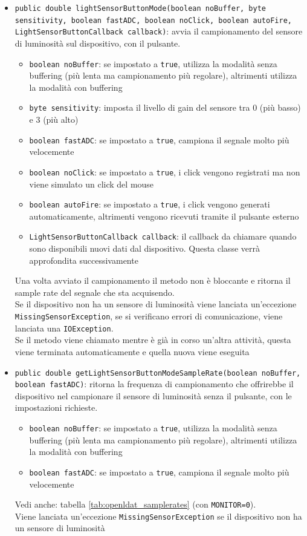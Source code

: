 \begin{itemize}
	\item \texttt{public double lightSensorButtonMode(boolean noBuffer, byte sensitivity, boolean fastADC, boolean noClick, boolean autoFire, LightSensorButtonCallback callback)}: avvia il campionamento del sensore di luminosità sul dispositivo, con il pulsante.\begin{itemize}
		\item \texttt{boolean noBuffer}: se impostato a \texttt{true}, utilizza la modalità senza buffering (più lenta ma campionamento più regolare), altrimenti utilizza la modalità con buffering
		\item \texttt{byte sensitivity}: imposta il livello di gain del sensore tra 0 (più basso) e 3 (più alto)
		\item \texttt{boolean fastADC}: se impostato a \texttt{true}, campiona il segnale molto più velocemente
		\item \texttt{boolean noClick}: se impostato a \texttt{true}, i click vengono registrati ma non viene simulato un click del mouse
		\item \texttt{boolean autoFire}: se impostato a \texttt{true}, i click vengono generati automaticamente, altrimenti vengono ricevuti tramite il pulsante esterno
		\item \texttt{LightSensorButtonCallback callback}: il callback da chiamare quando sono disponibili nuovi dati dal dispositivo. Questa classe verrà approfondita successivamente
	\end{itemize}
	Una volta avviato il campionamento il metodo non è bloccante e ritorna il sample rate del segnale che sta acquisendo.\\
	Se il dispositivo non ha un sensore di luminosità viene lanciata un'eccezione \texttt{MissingSensorException}, se si verificano errori di comunicazione, viene lanciata una \texttt{IOException}.\\
	Se il metodo viene chiamato mentre è già in corso un'altra attività, questa viene terminata automaticamente e quella nuova viene eseguita
	\item \texttt{public double getLightSensorButtonModeSampleRate(boolean noBuffer, boolean fastADC)}: ritorna la frequenza di campionamento che offrirebbe il dispositivo nel campionare il sensore di luminosità senza il pulsante, con le impostazioni richieste.\begin{itemize}
		\item \texttt{boolean noBuffer}: se impostato a \texttt{true}, utilizza la modalità senza buffering (più lenta ma campionamento più regolare), altrimenti utilizza la modalità con buffering
		\item \texttt{boolean fastADC}: se impostato a \texttt{true}, campiona il segnale molto più velocemente
	\end{itemize}
	Vedi anche: tabella \ref{tab:openldat_samplerates} (con \texttt{MONITOR=0}).\\
	Viene lanciata un'eccezione \texttt{MissingSensorException} se il dispositivo non ha un sensore di luminosità
\end{itemize}

